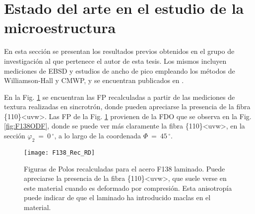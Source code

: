 \section{Estado del arte en el estudio de la microestructura}\label{S:F138Nati}
En esta sección se presentan los resultados previos obtenidos en el grupo de investigación al que pertenece el autor de esta tesis. Los mismos incluyen mediciones de EBSD y estudios de ancho de pico empleando los métodos de Williamson-Hall y CMWP, y se encuentran publicados en \cite{Devincentis2015PhD,Devincentis2017}.

En la Fig. \ref{fig:F138PF} se encuentran las FP recalculadas a partir de las mediciones de textura realizadas en sincrotrón, donde pueden apreciarse la presencia de la fibra \{110\}\textless uvw\textgreater. 
Las FP de la Fig. \ref{fig:F138PF} provienen de la FDO que se observa en la Fig. \ref{fig:F138ODF}, donde se puede ver más claramente la fibra \{110\}\textless uvw\textgreater, en la sección $\varphi_2 \ = \ 0$\,$^{\circ}$, a lo largo de la coordenada $\Phi \ = \ 45$\,$^{\circ}$.

\begin{figure}[!htb]
  \centering
  \texttt{[image: F138\_Rec\_RD]}
  \caption{Figuras de Polos recalculadas para el acero F138 laminado. Puede apreciarse la presencia de la fibra \{110\}\textless uvw\textgreater, que suele verse en este material cuando es deformado por compresión. Esta anisotropía puede indicar de que el laminado ha introducido maclas en el material.}
  \label{fig:F138PF}
\end{figure}

